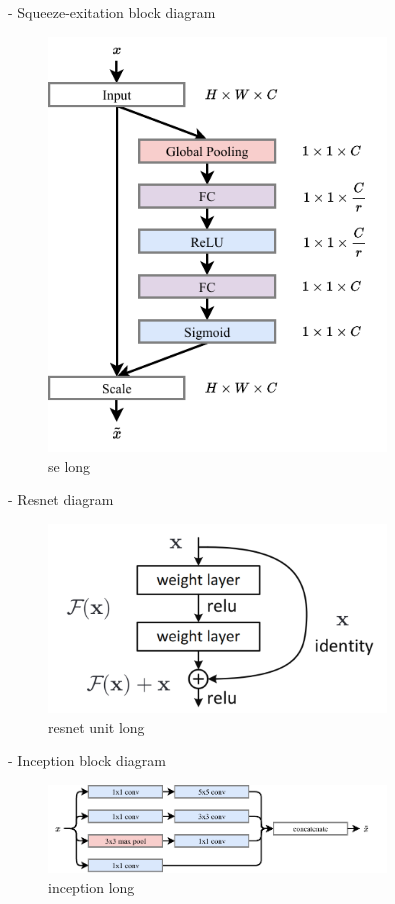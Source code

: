 - Squeeze-exitation block diagram
\begin{figure}
    \includegraphics[width=0.8\textwidth]{diagrams/6-cvn/se.pdf}
    \caption[se short]{se long}
    \label{fig:se}
\end{figure}
- Resnet diagram
\begin{figure}
    \includegraphics[width=0.8\textwidth]{diagrams/6-cvn/resnet_unit.png}
    \caption[resnet unit short]{resnet unit long}
    \label{fig:resnet_unit}
\end{figure}
- Inception block diagram
\begin{figure}
    \includegraphics[width=0.8\textwidth]{diagrams/6-cvn/inception.pdf}
    \caption[inception short]{inception long}
    \label{fig:se}
\end{figure}
